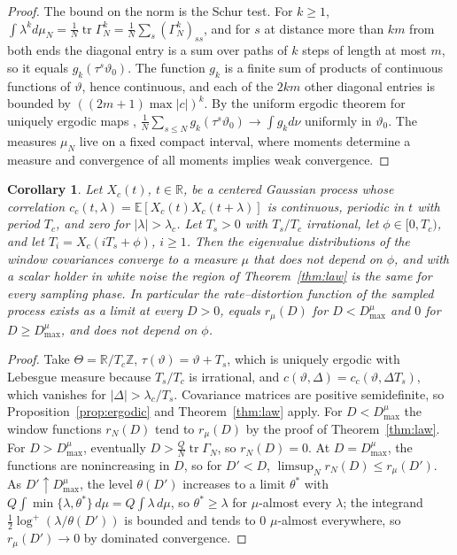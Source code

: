 \documentclass[11pt,onecolumn]{IEEEtran}
\newtheorem{corollary}[theorem]{Corollary}
\newcommand{\E}{\mathbb{E}}
\newcommand{\R}{\mathbb{R}}
\newcommand{\Z}{\mathbb{Z}}
\newcommand{\tr}{\operatorname{tr}}
\begin{document}
\begin{proof}
The bound on the norm is the Schur test. For $k\ge1$,
$\int\lambda^kd\mu_N=\tfrac1N\tr\Gamma_N^k=\tfrac1N\sum_s(\Gamma_N^k)_{ss}$,
and for $s$ at distance more than $km$ from both ends the diagonal
entry is a sum over paths of $k$ steps of length at most $m$, so it
equals $g_k(\tau^s\vartheta_0)$. The function $g_k$ is a finite sum of
products of continuous functions of $\vartheta$, hence continuous, and
each of the $2km$ other diagonal entries is bounded by
$((2m+1)\max|c|)^k$. By the uniform ergodic theorem for uniquely ergodic
maps \cite{oxtoby1952},
$\tfrac1N\sum_{s\le N}g_k(\tau^s\vartheta_0)\to\int g_kd\nu$ uniformly in
$\vartheta_0$. The measures $\mu_N$ live on a fixed compact interval,
where moments determine a measure and convergence of all moments
implies weak convergence.
\end{proof}

\begin{corollary}\label{cor:sampled}
Let $X_c(t)$, $t\in\R$, be a centered Gaussian process whose correlation
$c_c(t,\lambda)=\E[X_c(t)X_c(t+\lambda)]$ is continuous, periodic in $t$
with period $T_c$, and zero for $|\lambda|>\lambda_c$. Let $T_s>0$ with
$T_s/T_c$ irrational, let $\phi\in[0,T_c)$, and let
$T_i=X_c(iT_s+\phi)$, $i\ge1$. Then the eigenvalue distributions of the
window covariances converge to a measure $\mu$ that does not depend on
$\phi$, and with a scalar holder in white noise the region of
Theorem~\ref{thm:law} is the same for every sampling phase. In
particular the rate--distortion function of the sampled process exists
as a limit at every $D>0$, equals $r_\mu(D)$ for $D<D_{\max}^\mu$ and
$0$ for $D\ge D_{\max}^\mu$, and does not depend on $\phi$.
\end{corollary}

\begin{proof}
Take $\Theta=\R/T_c\Z$, $\tau(\vartheta)=\vartheta+T_s$, which is uniquely
ergodic with Lebesgue measure because $T_s/T_c$ is irrational, and
$c(\vartheta,\Delta)=c_c(\vartheta,\Delta T_s)$, which vanishes for
$|\Delta|>\lambda_c/T_s$. Covariance matrices are positive semidefinite,
so Proposition~\ref{prop:ergodic} and Theorem~\ref{thm:law} apply. For
$D<D_{\max}^\mu$ the window functions $r_N(D)$ tend to $r_\mu(D)$ by the
proof of Theorem~\ref{thm:law}. For $D>D_{\max}^\mu$, eventually
$D>\tfrac QN\tr\Gamma_N$, so $r_N(D)=0$. At $D=D_{\max}^\mu$, the
functions are nonincreasing in $D$, so for $D'<D$,
$\limsup_Nr_N(D)\le r_\mu(D')$. As $D'\uparrow D_{\max}^\mu$, the level
$\theta(D')$ increases to a limit $\theta^*$ with
$Q\int\min\{\lambda,\theta^*\}\,d\mu=Q\int\lambda\,d\mu$, so
$\theta^*\ge\lambda$ for $\mu$-almost every $\lambda$; the integrand
$\tfrac12\log^+(\lambda/\theta(D'))$ is bounded and tends to $0$
$\mu$-almost everywhere, so $r_\mu(D')\to0$ by dominated convergence.
\end{proof}
\end{document}
